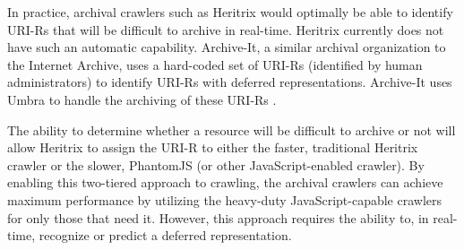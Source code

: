 \documentclass{sig-alternate}
\begin{document}
In practice, archival crawlers such as Heritrix would optimally be able to identify URI-Rs that will be difficult to archive in real-time. Heritrix currently does not have such an automatic capability. Archive-It, a similar archival organization to the Internet Archive, uses a hard-coded set of URI-Rs (identified by human administrators) to identify URI-Rs with deferred representations. Archive-It uses Umbra to handle the archiving of these URI-Rs \cite{umbra}.

The ability to determine whether a resource will be difficult to archive or not will allow Heritrix to assign the URI-R to either the faster, traditional Heritrix crawler or the slower,  PhantomJS (or other JavaScript-enabled crawler). By enabling this two-tiered approach to crawling, the archival crawlers can achieve maximum performance by utilizing the heavy-duty JavaScript-capable crawlers for only those that need it. However, this approach requires the ability to, in real-time, recognize or predict a deferred representation.
\end{document}
